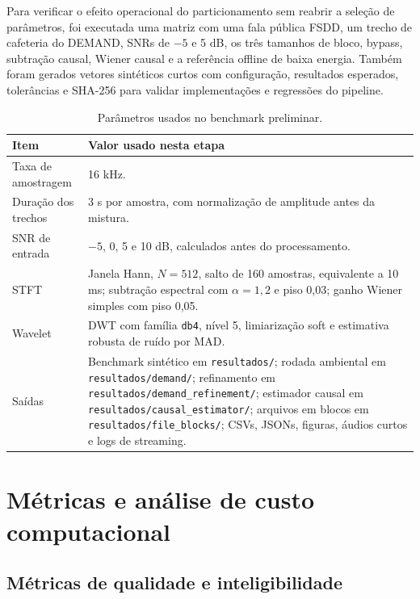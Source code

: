 Para verificar o efeito operacional do particionamento sem reabrir a seleção de parâmetros, foi executada uma matriz com uma fala pública FSDD, um trecho de cafeteria do DEMAND, SNRs de \(-5\) e 5 dB, os três tamanhos de bloco, bypass, subtração causal, Wiener causal e a referência offline de baixa energia. Também foram gerados vetores sintéticos curtos com configuração, resultados esperados, tolerâncias e SHA-256 para validar implementações e regressões do pipeline.

\begin{table}[!htbp]
\centering
\caption{Parâmetros usados no benchmark preliminar.}
\label{tab:protocolo}
\begin{tabularx}{\textwidth}{>{\raggedright\arraybackslash}p{4.0cm}X}
\toprule
\textbf{Item} & \textbf{Valor usado nesta etapa} \\
\midrule
Taxa de amostragem & 16 kHz. \\
\addlinespace
Duração dos trechos & 3 s por amostra, com normalização de amplitude antes da mistura. \\
\addlinespace
SNR de entrada & \(-5\), 0, 5 e 10 dB, calculados antes do processamento. \\
\addlinespace
STFT & Janela Hann, \(N=512\), salto de 160 amostras, equivalente a 10 ms; subtração espectral com \(\alpha=1{,}2\) e piso 0,03; ganho Wiener simples com piso 0,05. \\
\addlinespace
Wavelet & DWT com família \texttt{db4}, nível 5, limiarização soft e estimativa robusta de ruído por MAD. \\
\addlinespace
Saídas & Benchmark sintético em \texttt{resultados/}; rodada ambiental em \texttt{resultados/demand/}; refinamento em \texttt{resultados/demand\_refinement/}; estimador causal em \texttt{resultados/causal\_estimator/}; arquivos em blocos em \texttt{resultados/file\_blocks/}; CSVs, JSONs, figuras, áudios curtos e logs de streaming. \\
\bottomrule
\end{tabularx}
\end{table}
\FloatBarrier

\section{Métricas e análise de custo computacional}

\subsection{Métricas de qualidade e inteligibilidade}

